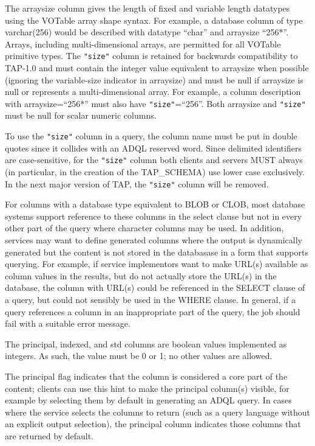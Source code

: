 \documentclass[11pt,letter]{ivoa}
\newcommand{\tapschema}{TAP\_SCHE\-MA}
\newcommand{\tapschema}{\mbox{%
  \relsize{-0.5}TAP\discretionary{-}{}{\kern-2pt\_}SCHEMA}}
\begin{document}
The arraysize column gives the length of fixed and variable length datatypes using the VOTable
array shape syntax. For example, a database column of type varchar(256) would be 
described with datatype ``char'' and arraysize ``256*''. Arrays, including multi-dimensional 
arrays, are permitted for all VOTable primitive types. The \verb|"size"| column is retained for backwards
compatibility to TAP-1.0 and must contain the integer value equivalent to arraysize when 
possible (ignoring the variable-size indicator in arraysize) and must be null if arraysize is null or 
represents a multi-dimensional array. For example, a column description with arraysize=``256*'' must also have 
\verb|"size"|=``256''. Both arraysize and \verb|"size"| must be null for scalar numeric columns.

To use the \verb|"size"| column in a query, the column name must be put in double quotes since 
it collides with an ADQL reserved word. Since delimited identifiers are case-sensitive, for the 
\verb|"size"| column both
clients and servers MUST always (in particular, in the creation of the 
\tapschema) use lower case exclusively. In the next major version 
of TAP, the \verb|"size"| column will be removed.

For columns with a database type equivalent to BLOB or CLOB, most database systems support
reference to these columns in the select clause but not in every other part of the query where
character columns may be used. In addition, services may want to define generated columns where the output is dynamically generated but the content is not stored in the 
databasase in a form that supports querying. For example, if service implementors want to make
URL(s) available as column values in the results, but do not actually store the URL(s) in the
database, the column with URL(s) could be referenced in the SELECT clause of a query, but could
not sensibly be used in the WHERE clause. In general, if a query references a column in an 
inappropriate part of the query, the job should fail with a suitable error message.

The principal, indexed, and std columns are boolean values implemented as integers. As such, 
the value must be 0 or 1; no other values are allowed.

The principal flag indicates that the column is considered a core part of the 
content; clients can use this hint to make the principal column(s) visible, for 
example by selecting them by default in generating an ADQL query. In cases where 
the service selects the columns to return (such as a query language without an 
explicit output selection), the principal column indicates those columns that 
are returned by default. 
\end{document}
